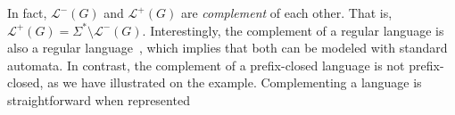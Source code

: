 In fact, $\mathcal{L}^{-}(G)$ and $\mathcal{L}^{+}(G)$ are \emph{complement} of each other. That is, $\mathcal{L}^{+}(G) = \Sigma^{*} \setminus \mathcal{L}^{-}(G)$. Interestingly, the complement of a regular language is also a regular language~\cite{Hopcroft:1979}, which implies that both can be modeled with standard automata. In contrast, the complement of a prefix-closed language is not prefix-closed, as we have illustrated on the example. Complementing a language is straightforward when represented 


